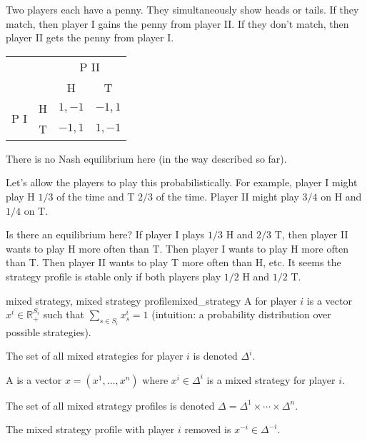 \documentclass[12pt,letterpaper]{report}
\begin{document}
\begin{ex}
  Two players each have a penny.
  They simultaneously show heads or tails.
  If they match, then player I gains the penny from player II.
  If they don't match, then player II gets the penny from player I.

  \begin{center}
    \renewcommand{\arraystretch}{1.2}
    \begin{tabular}{c c|c|c|}
      \multicolumn{2}{c}{} & \multicolumn{2}{c}{P II} \\
      \multicolumn{2}{c}{} & \multicolumn{1}{c}{H} & \multicolumn{1}{c}{T} \\
      \cline{3-4}
      \multirow{2}{*}{P I} & H & $1, -1$ & $-1, 1$ \\
      \cline{3-4}
      & T & $-1, 1$ & $1, -1$ \\
      \cline{3-4}
    \end{tabular}
  \end{center}

  There is no Nash equilibrium here (in the way described so far).

  Let's allow the players to play this probabilistically.
  For example, player I might play H $1/3$ of the time and T $2/3$ of the time.
  Player II might play $3/4$ on H and $1/4$ on T.

  Is there an equilibrium here?
  If player I plays $1/3$ H and $2/3$ T, then player II wants to play H more often than T.
  Then player I wants to play H more often than T.
  Then player II wants to play T more often than H, etc.
  It seems the strategy profile is stable only if both players play $1/2$ H and $1/2$ T.
\end{ex}

\begin{defn}{mixed strategy, mixed strategy profile}{mixed_strategy}
  A  for player $i$ is a vector $x^i \in \mathbb{R}_+^{S_i}$ such that
  $\sum\limits_{s \in S_i} x_s^i = 1$ (intuition: a probability distribution over possible
  strategies).

  The set of all mixed strategies for player $i$ is denoted $\Delta^i$.

  A  is a vector $x = (x^1, \ldots, x^n)$ where $x^i \in \Delta^i$ is
  a mixed strategy for player $i$.

  The set of all mixed strategy profiles is denoted
  $\Delta = \Delta^1 \times \cdots \times \Delta^n$.

  The mixed strategy profile with player $i$ removed is $x^{-i} \in \Delta^{-i}$.
\end{defn}
\end{document}
